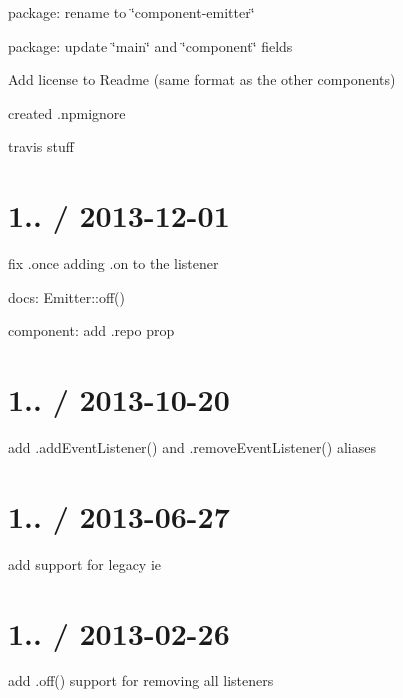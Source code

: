 
\begin{DoxyItemize}
\item package\+: rename to \char`\"{}component-\/emitter\char`\"{}
\item package\+: update \char`\"{}main\char`\"{} and \char`\"{}component\char`\"{} fields
\item Add license to Readme (same format as the other components)
\item created .npmignore
\item travis stuff
\end{DoxyItemize}

\section*{1.. / 2013-\/12-\/01 }


\begin{DoxyItemize}
\item fix .once adding .on to the listener
\item docs\+: Emitter\+::off()
\item component\+: add {\ttfamily .repo} prop
\end{DoxyItemize}

\section*{1.. / 2013-\/10-\/20 }


\begin{DoxyItemize}
\item add {\ttfamily .add\+Event\+Listener()} and {\ttfamily .remove\+Event\+Listener()} aliases
\end{DoxyItemize}

\section*{1.. / 2013-\/06-\/27 }


\begin{DoxyItemize}
\item add support for legacy ie
\end{DoxyItemize}

\section*{1.. / 2013-\/02-\/26 }


\begin{DoxyItemize}
\item add {\ttfamily .off()} support for removing all listeners
\end{DoxyItemize}

